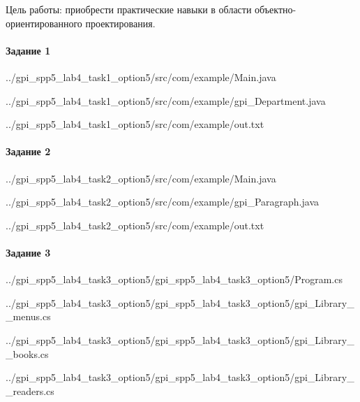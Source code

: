 Цель работы:
приобрести практические навыки в области объектно-ориентированного проектирования.


\paragraph{Задание 1} \hspace{0pt}


{../gpi_spp5_lab4_task1_option5/src/com/example/Main.java}


{../gpi_spp5_lab4_task1_option5/src/com/example/gpi_Department.java}


{../gpi_spp5_lab4_task1_option5/src/com/example/out.txt}



\paragraph{Задание 2} \hspace{0pt}


{../gpi_spp5_lab4_task2_option5/src/com/example/Main.java}


{../gpi_spp5_lab4_task2_option5/src/com/example/gpi_Paragraph.java}\


{../gpi_spp5_lab4_task2_option5/src/com/example/out.txt}



\paragraph{Задание 3} \hspace{0pt}


{../gpi_spp5_lab4_task3_option5/gpi_spp5_lab4_task3_option5/Program.cs}


{../gpi_spp5_lab4_task3_option5/gpi_spp5_lab4_task3_option5/gpi_Library__menus.cs}


{../gpi_spp5_lab4_task3_option5/gpi_spp5_lab4_task3_option5/gpi_Library__books.cs}


{../gpi_spp5_lab4_task3_option5/gpi_spp5_lab4_task3_option5/gpi_Library__readers.cs}

\newpage
